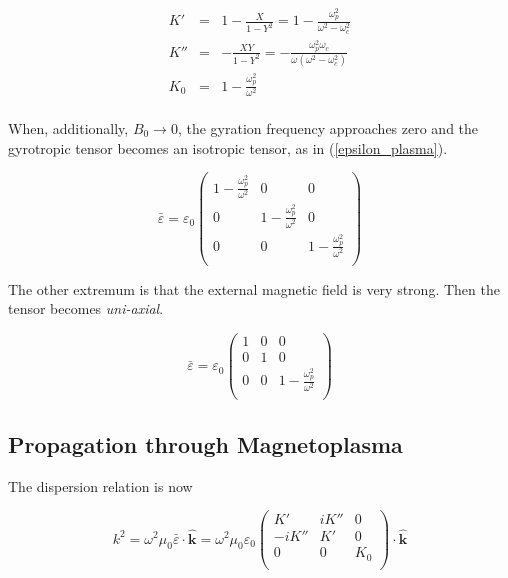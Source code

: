 \documentclass[a4paper,14pt]{extbook}
\begin{document}
\begin{eqnarray}
  K' &=& 1-\frac{X}{1-Y^2} = 1-\frac{\omega_p^2}{\omega^2-\omega_c^2}\\
K'' &=& -\frac{XY}{1-Y^2} = -\frac{\omega_p^2 \omega_c}{\omega(\omega^2-\omega_c^2)}\\
K_0 &=& 1-\frac{\omega_p^2}{\omega^2}
\end{eqnarray}

\paragraph*{}
When, additionally, $B_0\rightarrow 0$, the gyration frequency approaches zero and the gyrotropic tensor becomes an isotropic tensor, as in (\ref{epsilon_plasma}).

\begin{equation}\label{isotropic_tensor}
    \bar{\varepsilon}=\varepsilon_0\left(%
\begin{array}{ccc}
  1-\frac{\omega_p^2}{\omega^2} & 0 & 0 \\
0 & 1-\frac{\omega_p^2}{\omega^2} & 0 \\
0 & 0 & 1-\frac{\omega_p^2}{\omega^2} \\\end{array}%
\right)
\end{equation}

The other extremum is that the external magnetic field is very strong. Then the tensor becomes \emph{uni-axial}.

\begin{equation}\label{isotropic_tensor}
    \bar{\varepsilon}=\varepsilon_0\left(%
\begin{array}{ccc}
  1 & 0 & 0 \\
0 & 1 & 0 \\
0 & 0 & 1-\frac{\omega_p^2}{\omega^2} \\\end{array}%
\right)
\end{equation}

\subsection{Propagation through Magnetoplasma}
The dispersion relation is now

\begin{equation}\label{dispersion_relation_magnetoplasma}
    k^2=\omega^2\mu_0 \bar{\varepsilon}\cdot \mathbf{\hat{k}}=\omega^2\mu_0\varepsilon_0\left(%
\begin{array}{ccc}
  K' & iK'' & 0 \\
-iK'' & K' & 0 \\
0 & 0 & K_0 \\\end{array}%
\right)\cdot \mathbf{\hat{k}}
\end{equation}
\end{document}
